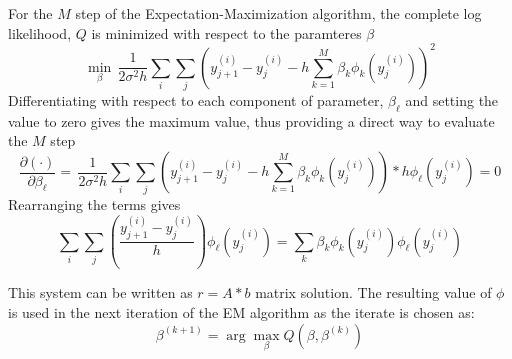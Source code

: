 \documentclass[12pt]{article}
\begin{document}
For the $M$ step of the Expectation-Maximization algorithm, the complete log likelihood, $Q$ is minimized with respect to the paramteres $\beta$
$$
\min_{\beta} \, \frac{1}{2 \sigma^2 h} \sum_{i} \sum_{j} (y_{j+1}^{(i)} - y_j^{(i)} - h \sum_{k=1}^{M} \beta_k \phi_k(y_j^{(i)}))^2
$$
Differentiating with respect to each component of parameter, $\beta_{\ell}$ and setting the value to zero gives the maximum value, thus providing a direct way to evaluate the $M$ step
$$
\frac{\partial (\cdot)}{\partial \beta_{\ell}} = \, \frac{1}{2 \sigma^2 h} \sum_{i} \sum_{j} (y_{j+1}^{(i)} - y_j^{(i)} - h \sum_{k=1}^{M} \beta_k \phi_k(y_j^{(i)})) * h \phi_{\ell}(y_j^{(i)}) = 0
$$
Rearranging the terms gives
$$
\sum_{i} \sum_{j} (\frac{y_{j+1}^{(i)} - y_j^{(i)}}{h}) \phi_{\ell}(y_{j}^{(i)}) = \sum_{k} \beta_k \phi_k(y_j^{(i)}) \phi_{\ell} (y_j^{(i)})
$$

This system can be written as $r = A * b$ matrix solution. The resulting value of $\phi$ is used in the next iteration of the EM algorithm as the iterate is chosen as:
$$
\beta^{(k+1)} = \arg \max_{\beta} Q(\beta, \beta^{(k)})
$$
\end{document}
